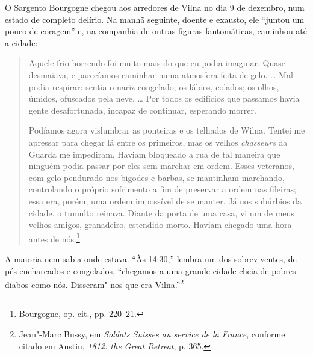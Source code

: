 %

O Sargento Bourgogne chegou aos arredores de Vilna no dia 9 de dezembro,
num estado de completo delírio. Na manhã seguinte, doente e exausto, ele
``juntou um pouco de coragem'' e, na companhia de outras figuras
fantomáticas, caminhou até a cidade:

\begin{quote}
Aquele frio horrendo foi muito mais do que eu podia imaginar. Quase
desmaiava, e parecíamos caminhar numa atmosfera feita de gelo. \ldots{}
Mal podia respirar: sentia o nariz congelado; os lábios, colados; os
olhos, úmidos, ofuscados pela neve. \ldots{} Por todos os edifícios que
passamos havia gente desafortunada, incapaz de continuar, esperando
morrer.

Podíamos agora vislumbrar as ponteiras e os telhados de Wilna. Tentei me
apressar para chegar lá entre os primeiros, mas os velhos
\emph{chasseurs} da Guarda me impediram. Haviam bloqueado a rua de tal
maneira que ninguém podia passar por eles sem marchar em ordem. Esses
veteranos, com gelo pendurado nos bigodes e barbas, se mantinham
marchando, controlando o próprio sofrimento a fim de preservar a ordem
nas fileiras; essa era, porém, uma ordem impossível de se manter. Já nos
subúrbios da cidade, o tumulto reinava. Diante da porta de uma casa, vi
um de meus velhos amigos, granadeiro, estendido morto. Haviam chegado
uma hora antes de nós.\footnote{Bourgogne, op. cit., pp. 220--21.}
\end{quote}

A maioria nem sabia onde estava. ``Às 14:30,'' lembra um dos
sobreviventes, de pés encharcados e congelados, ``chegamos a uma grande
cidade cheia de pobres diabos como nós. Disseram"-nos que era
Vilna.''\footnote{Jean"-Marc Bussy, em \emph{Soldats Suisses au service
  de la France}, conforme citado em Austin, \emph{1812: the Great
  Retreat}, p. 365.}

\asterisc

